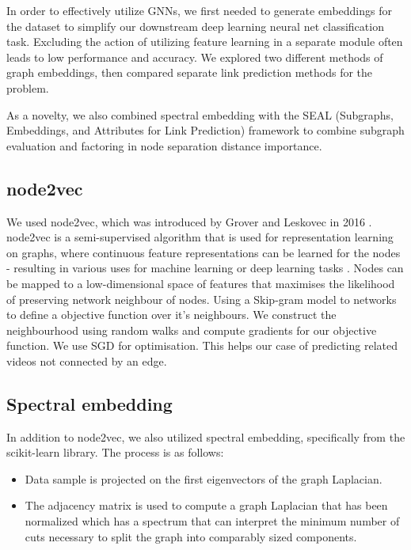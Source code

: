 \documentclass[10pt,twocolumn,letterpaper]{article}
\begin{document}
In order to effectively utilize GNNs, we first needed to generate embeddings for the dataset to simplify our downstream deep learning neural net classification task. Excluding the action of utilizing feature learning in a separate module often leads to low performance and accuracy. We explored two different methods of graph embeddings, then compared separate link prediction methods for the problem. 

As a novelty, we also combined spectral embedding with the SEAL (Subgraphs, Embeddings, and Attributes for Link Prediction) framework to combine subgraph evaluation and factoring in node separation distance importance.

\subsection{node2vec}

We used node2vec, which was introduced by Grover and Leskovec in 2016 \cite{node2vec}. node2vec is a semi-supervised algorithm that is used for representation learning on graphs, where continuous feature representations can be learned for the nodes - resulting in various uses for machine learning or deep learning tasks \cite{node2vec}. Nodes can be mapped to a low-dimensional space of features that maximises the likelihood of preserving network neighbour of nodes. Using a Skip-gram model to networks to define a objective function over it's neighbours. We construct the neighbourhood using random walks and compute gradients for our objective function. We use SGD for optimisation. This helps our case of predicting related videos not connected by an edge.

\subsection{Spectral embedding}

In addition to node2vec, we also utilized spectral embedding, specifically from the scikit-learn library. The process is as follows: \cite{spectral-embed}

\begin{itemize}
    \item Data sample is projected on the first eigenvectors of the graph Laplacian.
    \item The adjacency matrix is used to compute a graph Laplacian that has been normalized which has a spectrum that can interpret the minimum number of cuts necessary to split the graph into comparably sized components.
\end{itemize}
\end{document}
